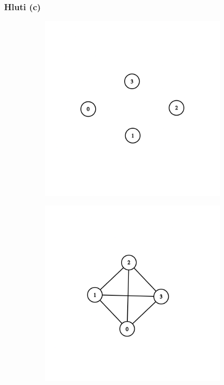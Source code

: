\documentclass[12pt, a4paper, hidelinks]{article}
\begin{document}
\newpage

\subsubsection*{Hluti (c)}
\begin{figure}[H]
    \centering
    \begin{subfigure}[b]{0.45\textwidth}
        \includegraphics[width=\textwidth]{graph_v4_1.png}
    \end{subfigure}
    \begin{subfigure}[b]{0.45\textwidth}
        \includegraphics[width=\textwidth]{graph_v4_2.png}
    \end{subfigure}
\end{figure}
\end{document}
